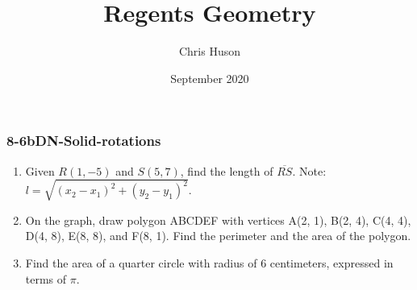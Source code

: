 \documentclass[12pt, twoside]{article}
\title{Regents Geometry}
\author{Chris Huson}
\date{September 2020}
\begin{document}
\subsubsection*{8-6bDN-Solid-rotations}
\begin{enumerate}
\item Given $R(1,-5)$ and $S(5,7)$, find the length of $\overline{RS}$. Note: $l=\sqrt{(x_2-x_1)^2+(y_2-y_1)^2}$. \vspace{4cm}

\item On the graph, draw polygon ABCDEF with vertices A(2, 1), B(2, 4), C(4, 4), D(4, 8), E(8, 8), and F(8, 1). Find the perimeter and the area of the polygon.\\[1cm]
  \vspace{1cm}
  
\item Find the area of a quarter circle with radius of 6 centimeters, expressed in terms of $\pi$.
  \begin{flushright}
 \end{flushright} %



\newpage

\end{enumerate}
\end{document}
